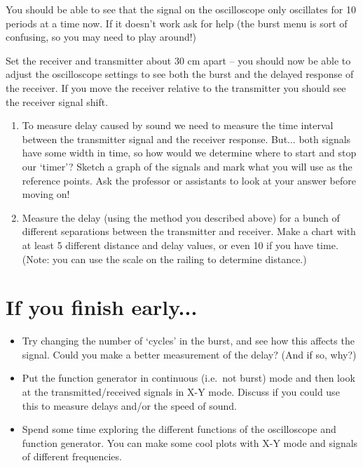 \documentclass[12pt, letterpaper]{article}
\begin{document}
You should be able to see that the signal on the oscilloscope only oscillates for 10 periods at a time now.
If it doesn't work ask for help (the burst menu is sort of confusing, so you may need to play around!)

Set the receiver and transmitter about 30 cm apart -- you should now be able to adjust the oscilloscope settings to see both the burst and the delayed response of the receiver.
If you move the receiver relative to the transmitter you should see the receiver signal shift.

\begin{enumerate}
	\item To measure delay caused by sound we need to measure the time interval between the transmitter signal and the receiver response.
	But... both signals have some width in time, so how would we determine where to start and stop our `timer'?
	Sketch a graph of the signals and mark what you will use as the reference points.
	Ask the professor or assistants to look at your answer before moving on!
	
	\fillanswergrid
	\item Measure the delay (using the method you described above) for a bunch of different separations between the transmitter and receiver.
	Make a chart with at least 5 different distance and delay values, or even 10 if you have time.
	(Note: you can use the scale on the railing to determine distance.)
	
	\fillanswergrid
\end{enumerate}


\section{If you finish early...}
\begin{itemize}
	\item Try changing the number of `cycles' in the burst, and see how this affects the signal.  Could you make a better measurement of the delay?  (And if so, why?)
	\item Put the function generator in continuous (i.e.~not burst) mode and then look at the transmitted/received signals in X-Y mode.  Discuss if you could use this to measure delays and/or the speed of sound.
	\item Spend some time exploring the different functions of the oscilloscope and function generator.  You can make some cool plots with X-Y mode and signals of different frequencies.
\end{itemize}
\end{document}
